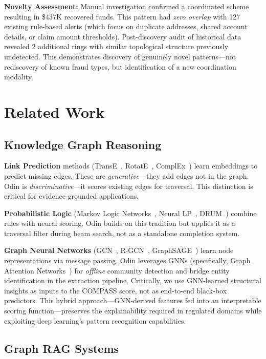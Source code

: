 \documentclass[10pt,twocolumn]{article}
\begin{document}
\textbf{Novelty Assessment:} Manual investigation confirmed a coordinated scheme resulting in \$437K recovered funds. This pattern had \textit{zero overlap} with 127 existing rule-based alerts (which focus on duplicate addresses, shared account details, or claim amount thresholds). Post-discovery audit of historical data revealed 2 additional rings with similar topological structure previously undetected. This demonstrates discovery of genuinely novel patterns—not rediscovery of known fraud types, but identification of a new coordination modality.

\section{Related Work}

\subsection{Knowledge Graph Reasoning}

\textbf{Link Prediction} methods (TransE~\cite{bordes2013translating}, RotatE~\cite{sun2019rotate}, ComplEx~\cite{trouillon2016complex}) learn embeddings to predict missing edges. These are \textit{generative}---they add edges not in the graph. Odin is \textit{discriminative}---it scores existing edges for traversal. This distinction is critical for evidence-grounded applications.

\textbf{Probabilistic Logic} (Markov Logic Networks~\cite{richardson2006markov}, Neural LP~\cite{yang2017differentiable}, DRUM~\cite{sadeghian2019drum}) combine rules with neural scoring. Odin builds on this tradition but applies it as a traversal filter during beam search, not as a standalone completion system.

\textbf{Graph Neural Networks} (GCN~\cite{kipf2016semi}, R-GCN~\cite{schlichtkrull2018modeling}, GraphSAGE~\cite{hamilton2017inductive}) learn node representations via message passing. Odin leverages GNNs (specifically, Graph Attention Networks~\cite{velickovic2017graph}) for \textit{offline} community detection and bridge entity identification in the extraction pipeline. Critically, we use GNN-learned structural insights as inputs to the COMPASS score, not as end-to-end black-box predictors. This hybrid approach—GNN-derived features fed into an interpretable scoring function—preserves the explainability required in regulated domains while exploiting deep learning's pattern recognition capabilities.

\subsection{Graph RAG Systems}
\end{document}
